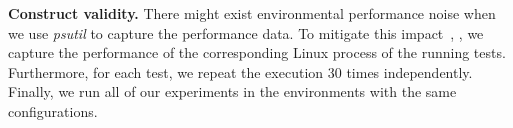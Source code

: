 
\noindent \textbf{Construct validity.} %
There might exist environmental performance noise when we use \emph{psutil} to capture the performance data. To mitigate this impact~, , we capture the performance of the corresponding Linux process of the running tests. Furthermore, for each test, we repeat the execution 30 times independently. %
Finally, we run all of our experiments in the environments with the same configurations.